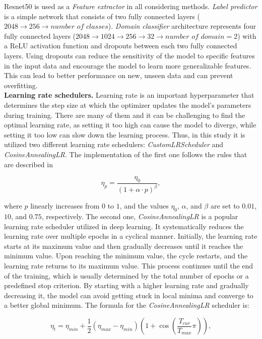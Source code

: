 Resnet50 is used as a \textit{Feature extractor} in all considering methods. \textit{Label predictor} is a simple network that consists of two fully connected layers ($2048 \rightarrow 256 \rightarrow \textit{number of classes}$). \textit{Domain classifier} architecture represents four fully connected layers ($2048 \rightarrow 1024 \rightarrow 256 \rightarrow 32 \rightarrow \textit{number of domain}=2$) with a ReLU activation function and dropouts between each two fully connected layers. Using dropouts can reduce the sensitivity of the model to specific features in the input data and encourage the model to learn more generalizable features. This can lead to better performance on new, unseen data and can prevent overfitting. \\

\textbf{Learning rate schedulers.} Learning rate is an important hyperparameter that determines the step size at which the optimizer updates the model's parameters during training. There are many of them and it can be challenging to find the optimal learning rate, as setting it too high can cause the model to diverge, while setting it too low can slow down the learning process. Thus, in this study it is utilized two different learning rate schedulers: \textit{CustomLRScheduler} and \textit{CosineAnnealingLR}. The implementation of the first one follows the rules that are described in \cite{ganin2015unsupervised} 

$$
\eta_p = \dfrac{\eta_0}{(1 + \alpha \cdot p)^\beta},
$$

where $p$ linearly increases from $0$ to $1$, and the values $\eta_0$, $\alpha$, and $\beta$ are set to $0.01$, $10$, and $0.75$, respectively. The second one, \textit{CosineAnnealingLR} is a popular learning rate scheduler utilized in deep learning. It systematically reduces the learning rate over multiple epochs in a cyclical manner. Initially, the learning rate starts at its maximum value and then gradually decreases until it reaches the minimum value. Upon reaching the minimum value, the cycle restarts, and the learning rate returns to its maximum value. This process continues until the end of the training, which is usually determined by the total number of epochs or a predefined stop criterion. By starting with a higher learning rate and gradually decreasing it, the model can avoid getting stuck in local minima and converge to a better global minimum. The formula for the \textit{CosineAnnealingLR} scheduler is:

$$
\eta_t = \eta_{min} + \dfrac{1}{2}(\eta_{max} - \eta_{min}) \left(1 + \cos \left( \dfrac{T_{cur}}{T_{max}} \pi \right)\right),
$$

